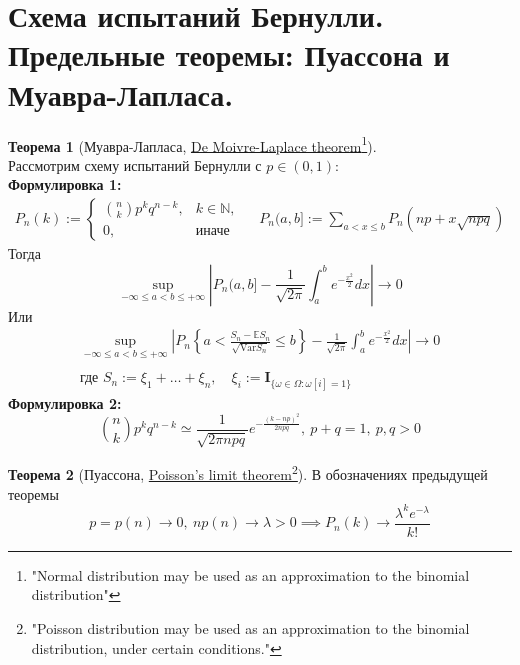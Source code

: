 \documentclass[11pt,a4paper]{report}
\def\E{\mathbb{E}}
\def\Var{\mathrm{Var}}
\def\Natural{\mathbb{N}}
\theoremstyle{definition}
\theoremstyle{definition}
\newtheorem{theorem}{Теорема}[section]
\theoremstyle{definition}
\begin{document}
	\section{Схема испытаний Бернулли. Предельные теоремы: Пуассона и Муавра-Лапласа.}
	\begin{theorem}[Муавра-Лапласа, \href{https://goo.gl/azXZGx}{De Moivre-Laplace theorem}\footnote{"Normal distribution may be used as an approximation to the binomial distribution"}]$  $\\
		Рассмотрим схему испытаний Бернулли с $ p \in (0, 1) $:\\
		\textbf{Формулировка 1:}\\
		\begin{gather*}
			P_{n}(k) := \begin{cases} 
					{{n}\choose{k}} p^{k} q^{n-k}, & k \in \Natural,\\
					0, & \text{иначе}
				\end{cases}\quad
			\ P_{n}(a, b] := \sum\limits_{a < x \le b} P_{n}(np + x\sqrt{npq})
		\end{gather*}
		Тогда 
		\[ \sup\limits_{-\infty \le a < b \le +\infty }  \left| P_{n}(a, b] - \frac{1}{\sqrt{2\pi}} \int_{a}^{b} e^{-\frac{x^{2}}{2}} dx \right| \to 0 \]
		Или 
		\begin{gather*} 
			\sup\limits_{-\infty \le a < b \le +\infty }  \left| P_{n}\left\{ a < \frac{S_{n} - \E S_{n} }{\sqrt{\Var S_{n}}} \le b \right\} - \frac{1}{\sqrt{2\pi}} \int_{a}^{b} e^{-\frac{x^{2}}{2}} dx \right| \to 0\\
			\\
			\text{где } S_{n} := \xi_{1} + \dots + \xi_{n},\quad \xi_{i} := \mathbf{I}_{\{ \omega \in \Omega: \omega[i] = 1 \}}
		\end{gather*}
		\textbf{Формулировка 2:}\\
		\[ {{n}\choose{k}} p^{k} q^{n-k} \simeq \frac{1}{\sqrt{2 \pi npq}} e^{-\frac{(k - np)^{2}}{2npq}},\ p + q = 1,\ p, q > 0  \]
	\end{theorem}
	\begin{theorem}[Пуассона, \href{https://goo.gl/V5aRg3}{Poisson's limit theorem}\footnote{"Poisson distribution may be used as an approximation to the binomial distribution, under certain conditions."}]
		В обозначениях предыдущей теоремы
		\[
			p = p(n) \to 0,\ n p(n) \to \lambda > 0 \implies P_{n}(k) \to \frac{\lambda^{k} e^{-\lambda}}{k!}
		\]
	\end{theorem}
\end{document}
